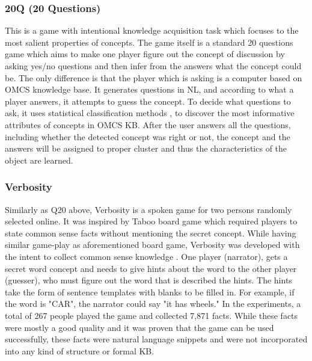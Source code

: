 \subsubsection{20Q (20 Questions)}
\label{section:r:20q}
This is a game with intentional knowledge acquisition task
which focuses to the most salient properties of concepts. The game itself is
a standard 20 questions game which aims to make one player figure out the 
concept of discussion by asking yes/no questions and then infer from the 
answers what the concept could be. The only difference is that the player which
is asking is a computer based on OMCS knowledge base. It generates questions in
NL, and according to what a player answers, it attempts to guess the concept.
To decide what questions to ask, it uses statistical classification methods
\parencite{Speer2009}, to discover the most informative attributes of concepts
in OMCS KB. After the user answers all the questions, including whether the
detected concept was right or not, the concept and the answers will be assigned
to proper cluster and thus the characteristics of the object are learned.

\subsubsection{Verbosity}
\label{section:r:verbosity}
Similarly as Q20 above, Verbosity is a spoken game for two 
persons randomly selected online. It was inspired by Taboo board 
game\parencite{TabooGame} which required players to state common sense facts
without mentioning the secret concept. While having similar game-play as 
aforementioned board game, Verbosity was developed with the intent to collect
common sense knowledge \parencite{VonAhn2006a}. One player (narrator), gets
a secret word concept and needs to give hints about the word to the other 
player (guesser), who must figure out the word that is described the hints.
The hints take the form of sentence templates with blanks to be filled in. 
For example, if the word is "CAR", the narrator could say "it has wheels."
In the experiments, a total of 267 people played the game and collected
7,871 facts. While these facts were mostly a good quality and it was proven
that the game can be used successfully, these facts were natural language 
snippets and were not incorporated into any kind of structure or formal KB. 

